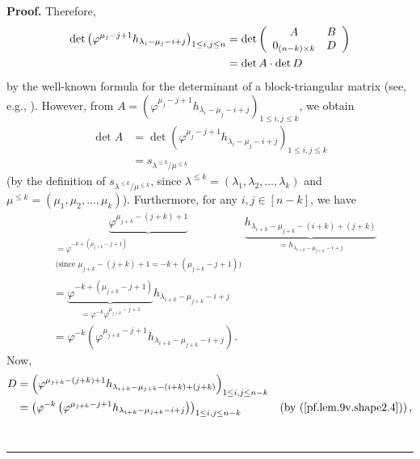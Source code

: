 \documentclass[numbers=enddot,12pt,final,onecolumn,notitlepage]{scrartcl}%
\theoremstyle{definition}
\newenvironment{proof}[1][Proof]{\noindent\textbf{#1.} }{\ \rule{0.5em}{0.5em}}
\begin{document}
\begin{enumerate}
\begin{proof}
Therefore,
\begin{align}
\det\left(  \varphi^{\mu_{j}-j+1}h_{\lambda_{i}-\mu_{j}-i+j}\right)  _{1\leq
i,j\leq n}  &  =\det\left(
\begin{array}
[c]{cc}%
A & B\\
0_{\left(  n-k\right)  \times k} & D
\end{array}
\right) \nonumber\\
&  =\det A\cdot\det D \label{pf.lem.9v.shape2.detfact}%
\end{align}
by the well-known formula for the determinant of a block-triangular matrix
(see, e.g., \cite[Exercise 6.29]{detnotes}). However, from $A=\left(
\varphi^{\mu_{j}-j+1}h_{\lambda_{i}-\mu_{j}-i+j}\right)  _{1\leq i,j\leq k}$,
we obtain%
\begin{align}
\det A  &  =\det\left(  \varphi^{\mu_{j}-j+1}h_{\lambda_{i}-\mu_{j}%
-i+j}\right)  _{1\leq i,j\leq k}\nonumber\\
&  =s_{\lambda^{\leq k}/\mu^{\leq k}} \label{pf.lem.9v.shape2.A}%
\end{align}
(by the definition of $s_{\lambda^{\leq k}/\mu^{\leq k}}$, since
$\lambda^{\leq k}=\left(  \lambda_{1},\lambda_{2},\ldots,\lambda_{k}\right)  $
and $\mu^{\leq k}=\left(  \mu_{1},\mu_{2},\ldots,\mu_{k}\right)  $).
Furthermore, for any $i,j\in\left[  n-k\right]  $, we have%
\begin{align}
&  \underbrace{\varphi^{\mu_{j+k}-\left(  j+k\right)  +1}}_{\substack{=\varphi
^{-k+\left(  \mu_{j+k}-j+1\right)  }\\\text{(since }\mu_{j+k}-\left(
j+k\right)  +1=-k+\left(  \mu_{j+k}-j+1\right)  \text{)}}%
}\underbrace{h_{\lambda_{i+k}-\mu_{j+k}-\left(  i+k\right)  +\left(
j+k\right)  }}_{=h_{\lambda_{i+k}-\mu_{j+k}-i+j}}\nonumber\\
&  =\underbrace{\varphi^{-k+\left(  \mu_{j+k}-j+1\right)  }}_{=\varphi
^{-k}\varphi^{\mu_{j+k}-j+1}}h_{\lambda_{i+k}-\mu_{j+k}-i+j}\nonumber\\
&  =\varphi^{-k}\left(  \varphi^{\mu_{j+k}-j+1}h_{\lambda_{i+k}-\mu_{j+k}%
-i+j}\right)  . \label{pf.lem.9v.shape2.4}%
\end{align}
Now,
\begin{align*}
D  &  =\left(  \varphi^{\mu_{j+k}-\left(  j+k\right)  +1}h_{\lambda_{i+k}%
-\mu_{j+k}-\left(  i+k\right)  +\left(  j+k\right)  }\right)  _{1\leq i,j\leq
n-k}\\
&  =\left(  \varphi^{-k}\left(  \varphi^{\mu_{j+k}-j+1}h_{\lambda_{i+k}%
-\mu_{j+k}-i+j}\right)  \right)  _{1\leq i,j\leq n-k}%
\ \ \ \ \ \ \ \ \ \ \left(  \text{by (\ref{pf.lem.9v.shape2.4})}\right)  ,

\end{align*}
\end{proof}
\end{enumerate}
\end{document}

